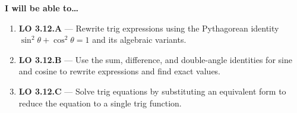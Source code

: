 \documentclass[10pt]{article}
\begin{document}
\namedateperiod

\vspace{0.10in}

\begin{objectivebox}
\textbf{I will be able to\ldots}
\begin{enumerate}[leftmargin=1.5em, itemsep=4pt]
  \item \textbf{LO 3.12.A} --- Rewrite trig expressions using the Pythagorean identity
    $\sin^2\theta + \cos^2\theta = 1$ and its algebraic variants. \writeline
  \item \textbf{LO 3.12.B} --- Use the sum, difference, and double-angle identities for
    sine and cosine to rewrite expressions and find exact values. \writeline
  \item \textbf{LO 3.12.C} --- Solve trig equations by substituting an equivalent form to
    reduce the equation to a single trig function. \writeline
\end{enumerate}
\end{objectivebox}

\vspace{0.08in}
\end{document}
